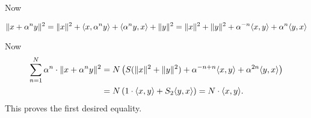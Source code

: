 \begin{enumerate}
Now
\iffalse
\begin{align*}
 \|x + \alpha^n y\|^2
   &= \|x\|^2 + \lrangle{x, \alpha^n y} + \lrangle{\alpha^n y, x} + \|y\|^2 \\
   &= \|x\|^2 + \overline{\alpha^n}\lrangle{x, y}
             + \alpha^n\overline{\lrangle{x, y}} + \|y\|^2. \\
   &= \|x\|^2 + 2\Re\left(\alpha^{-n}\lrangle{x, y}\right) + \|y\|^2.
\end{align*}
\fi
\begin{equation*}
 \|x + \alpha^n y\|^2
   = \|x\|^2 + \langle x, \alpha^n y \rangle + \langle \alpha^n y, x \rangle + \|y\|^2
   = \|x\|^2 + \|y\|^2 + \alpha^{-n}\langle x, y \rangle + \alpha^n \langle y, x \rangle 
\end{equation*}

Now
\begin{align*}
\sum_{n=1}^N \alpha^n \cdot \|x + \alpha^n y\|^2 
 &= N\left(S(\|x\|^2 + \|y\|^2)
    + \alpha^{-n+n}\langle x, y \rangle + \alpha^{2n} \langle y, x \rangle\right) \\
 &= N\left( 1\cdot \langle x, y \rangle + S_2\langle y, x \rangle\right)
    = N\cdot \langle x, y \rangle.
\end{align*}
This proves the first desired equality.

\unfinished

\end{enumerate}


